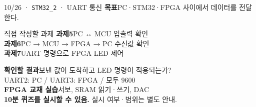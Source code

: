\documentclass[aspectratio=43,11pt,t]{beamer}
\newcommand{\lab}[1]{\texttt{STM32\_#1}}
\begin{document}
\begin{frame}{10/26 · \lab{2} · UART 통신}
\fontsize{10}{13}\selectfont
\textbf{목표}\quad PC·STM32·FPGA 사이에서 데이터를 전달한다.
\vspace{0.2cm}
\begin{block}{직접 작성할 과제}
\fontsize{10}{13}\selectfont
\textbf{과제5}\quad PC ↔ MCU 입출력 확인\\[0.1cm]
\textbf{과제6}\quad PC → MCU → FPGA → PC 수신값 확인\\[0.1cm]
\textbf{과제7}\quad UART 명령으로 FPGA LED 제어
\end{block}
\vspace{0.15cm}
\textbf{확인할 결과}\quad 보낸 값이 도착하고 LED 명령이 적용되는가?\\[0.15cm]
\fontsize{9}{12}\selectfont
UART2: PC / UART3: FPGA / 모두 9600\\[0.12cm]
\textbf{FPGA 교재 실습}\quad 서보, SRAM 읽기·쓰기, DAC\\[0.12cm]
\textbf{\color{UOSBlue}10분 퀴즈를 실시할 수 있음.} 실시 여부·범위는 별도 안내.
\end{frame}
\end{document}
